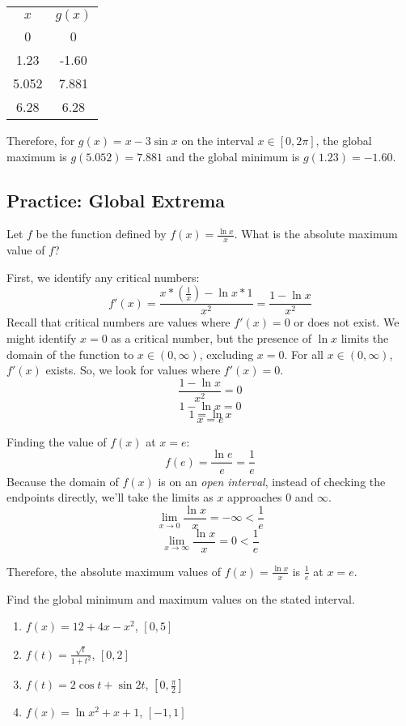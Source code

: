 \begin{tabular}{c | c}
$x$ & $g(x)$\\
0 & 0\\
1.23 & -1.60\\
5.052 & 7.881\\
6.28 & 6.28\\
\end{tabular}

Therefore, for $g(x) = x-3\sin{x}$ on the interval $x \in [0, 2\pi]$, the 
global maximum is $g(5.052) = 7.881$ and the global minimum is $g(1.23) = 
-1.60$. 

\subsection{Practice: Global Extrema}
\begin{Exercise}[label=gloext1]
Let $f$ be the function defined by $f(x) = \frac{\ln{x}}{x}$. What is the 
absolute maximum value of $f$?
\end{Exercise}

\begin{Answer}[ref=gloext1]
First, we identify any critical numbers:
$$f'(x) = \frac{x*(\frac{1}{x})-\ln{x}*1}{x^2} = \frac{1-\ln{x}}{x^2}$$
Recall that critical numbers are values where $f'(x)=0$ or does not exist. 
We might identify $x=0$ as a critical number, but the presence of $\ln{x}$ 
limits the domain of the function to $x \in (0, \infty)$, excluding $x=0$. 
For all $x \in (0, \infty)$, $f'(x)$ exists. So, we look for values where 
$f'(x) = 0$.
$$\frac{1-\ln{x}}{x^2}=0$$
$$1-\ln{x}=0$$
$$1=\ln{x}$$
$$x=e$$

Finding the value of $f(x)$ at $x=e$: 
$$f(e) = \frac{\ln{e}}{e}=\frac{1}{e}$$
Because the domain of $f(x)$ is on an \textit{open interval}, instead of 
checking the endpoints directly, we'll take the limits as $x$ approaches $0$ 
and $\infty$.
$$\lim_{x\to 0}\frac{\ln{x}}{x}=-\infty<\frac{1}{e}$$
$$\lim_{x \to \infty}\frac{\ln{x}}{x}=0<\frac{1}{e}$$

Therefore, the absolute maximum values of $f(x) = \frac{\ln{x}}{x}$ is $\frac{
1}{e}$ at $x=e$. 
\end{Answer}

\begin{Exercise}[label=gloext2]
Find the global minimum and maximum values on the stated interval.
\begin{enumerate}
	\item $f(x) = 12+4x-x^2$, $[0,5]$
	\item $f(t) = \frac{\sqrt{t}}{1+t^2}$, $[0, 2]$
	\item $f(t) = 2\cos{t} + \sin{2t}$, $[0, \frac{\pi}{2}]$
	\item $f(x) = \ln{x^2+x+1}$, $[-1, 1]$
\end{enumerate}
\end{Exercise}

